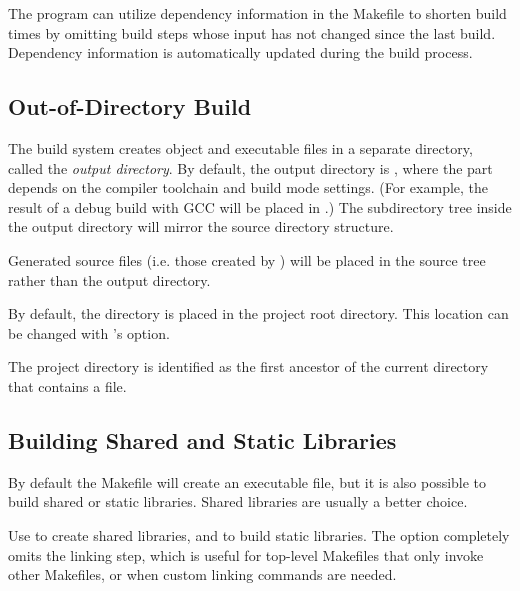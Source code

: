 The  program can utilize dependency information in the Makefile
to shorten build times by omitting build steps whose input has not changed
since the last build. Dependency information is automatically updated
during the build process.


\subsection{Out-of-Directory Build}
\label{sec:build-sim-progs:out-of-directory-build}

The build system creates object and executable files in a separate directory, called the
\textit{output directory}. By default, the output directory is ,
where the  part depends on the compiler toolchain and build mode settings.
(For example, the result of a debug build with GCC will be placed in .)
The subdirectory tree inside the output directory will mirror the source directory
structure.

\begin{note}
Generated source files (i.e. those created by ) will be placed in the
source tree rather than the output directory.
\end{note}

By default, the  directory is placed in the project root directory. This location
can be changed with 's  option.


\begin{note}
The project directory is identified as the first ancestor of the current directory
that contains a  file.
\end{note}


\subsection{Building Shared and Static Libraries}
\label{sec:build-sim-progs:building-shared-and-static-libraries}

By default the Makefile will create an executable file, but it is also
possible to build shared or static libraries. Shared libraries
are usually a better choice.

Use  to create shared libraries, and 
to build static libraries. The  option completely omits
the linking step, which is useful for top-level Makefiles that only invoke
other Makefiles, or when custom linking commands are needed.

